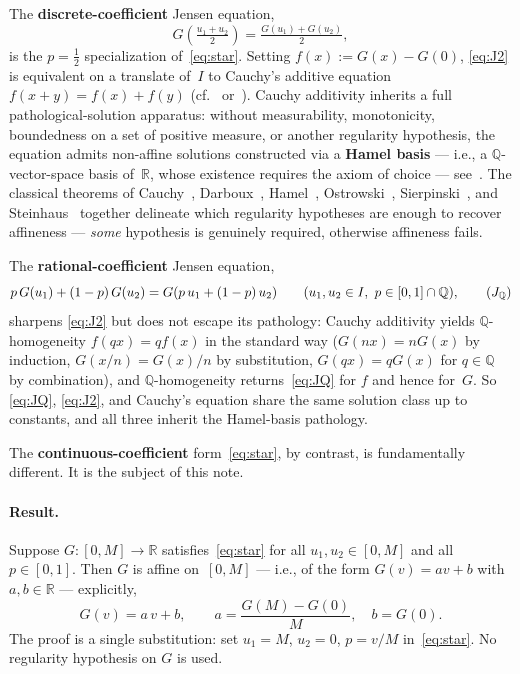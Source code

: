 \documentclass[11pt,a4paper]{amsart}
\newcommand{\R}{\mathbb R}
\newcommand{\Q}{\mathbb Q}
\begin{document}
The \textbf{discrete-coefficient} Jensen equation,
\begin{equation}
G\!\left(\tfrac{u_1+u_2}{2}\right) = \tfrac{G(u_1)+G(u_2)}{2},
\tag{$J_2$}\label{eq:J2}
\end{equation}
is the $p=\tfrac12$ specialization of~\eqref{eq:star}. Setting
$f(x) := G(x) - G(0)$, \eqref{eq:J2} is equivalent on a translate of~$I$
to Cauchy's additive equation $f(x+y) = f(x)+f(y)$ (cf.~\cite{Aczel1966}
or~\cite{Kuczma2009}). Cauchy additivity inherits a full
pathological-solution apparatus: without measurability, monotonicity,
boundedness on a set of positive measure, or another regularity hypothesis,
the equation admits non-affine solutions constructed via a \textbf{Hamel
basis} --- i.e., a $\Q$-vector-space basis of~$\R$, whose existence requires
the axiom of choice --- see~\cite{Hamel1905}. The classical theorems of
Cauchy~\cite{Cauchy1821}, Darboux~\cite{Darboux1875},
Hamel~\cite{Hamel1905}, Ostrowski~\cite{Ostrowski1929},
Sierpinski~\cite{Sierpinski1920}, and Steinhaus~\cite{Steinhaus1920}
together delineate which regularity hypotheses are enough to recover
affineness --- \emph{some} hypothesis is genuinely required, otherwise
affineness fails.

The \textbf{rational-coefficient} Jensen equation,
\begin{equation}
p\,G(u_1)+(1-p)\,G(u_2)=G(p\,u_1+(1-p)\,u_2)
\qquad (u_1,u_2\in I,\ p\in[0,1]\cap\Q),
\tag{$J_{\Q}$}\label{eq:JQ}
\end{equation}
sharpens \eqref{eq:J2} but does not escape its pathology: Cauchy additivity
yields $\Q$-homogeneity $f(qx) = qf(x)$ in the standard way ($G(nx)=nG(x)$
by induction, $G(x/n) = G(x)/n$ by substitution, $G(qx)=qG(x)$ for
$q\in\Q$ by combination), and $\Q$-homogeneity returns~\eqref{eq:JQ} for
$f$ and hence for~$G$. So \eqref{eq:JQ}, \eqref{eq:J2}, and Cauchy's
equation share the same solution class up to constants, and all three
inherit the Hamel-basis pathology.

The \textbf{continuous-coefficient} form~\eqref{eq:star}, by contrast, is
fundamentally different. It is the subject of this note.

\paragraph{Result.}
Suppose $G\colon[0,M]\to\R$ satisfies~\eqref{eq:star} for all
$u_1,u_2\in[0,M]$ and all $p\in[0,1]$. Then $G$ is affine on~$[0,M]$ ---
i.e., of the form $G(v)=av+b$ with $a,b\in\R$ --- explicitly,
\[
G(v) = a\,v + b, \qquad a = \frac{G(M)-G(0)}{M},\quad b=G(0).
\]
The proof is a single substitution: set $u_1=M$, $u_2=0$, $p=v/M$
in~\eqref{eq:star}. No regularity hypothesis on $G$ is used.
\end{document}
